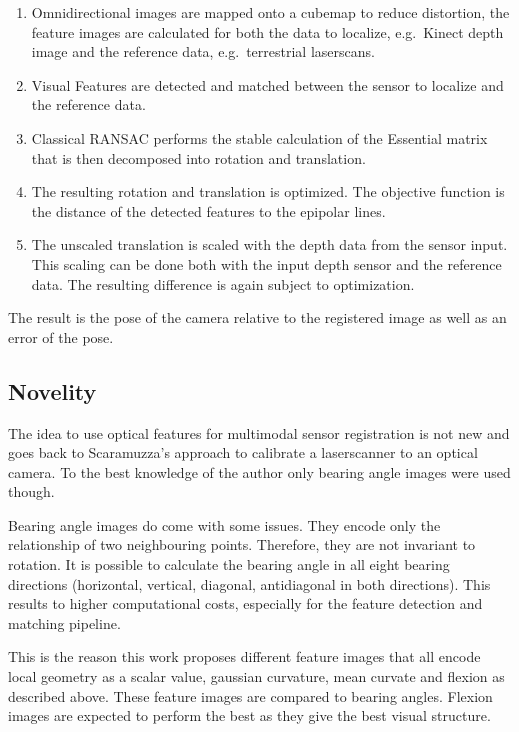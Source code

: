 \documentclass[doktyp=marbeit,fontsize=12pt,sprache=english,draft=true,hausschrift=true]{TUBAFarbeiten}
\begin{document}
\begin{enumerate}
\item Omnidirectional images are mapped onto a cubemap to reduce distortion,
  the feature images are calculated for both the data to localize,
  e.g.~Kinect depth image and the reference data, e.g.~terrestrial
  laserscans.
\item Visual Features are detected and matched between the sensor to
  localize and the reference data.
\item Classical RANSAC performs the stable calculation of the
  Essential matrix that is then decomposed into rotation and translation.
\item The resulting rotation and translation is optimized. The objective
  function is the distance of the detected features to the epipolar
  lines.
\item The unscaled translation is scaled with the depth data from the sensor
  input. This scaling can be done both with the input depth sensor and
  the reference data. The resulting difference is again subject to
  optimization.
\end{enumerate}

The result is the pose of the camera relative to the registered image as well as an error of the pose.

\subsection{Novelity}\label{novelity}

The idea to use optical features for multimodal sensor registration is
not new and goes back to Scaramuzza's approach to calibrate a
laserscanner to an optical camera. To the best knowledge of the author
only bearing angle images were used though.

Bearing angle images do come with some issues. They encode only the
relationship of two neighbouring points. Therefore, they are not
invariant to rotation. It is possible to calculate the bearing angle in
all eight bearing directions (horizontal, vertical, diagonal, antidiagonal in
both directions). This results to higher computational costs, especially
for the feature detection and matching pipeline.

This is the reason this work proposes different feature images that all
encode local geometry as a scalar value, gaussian curvature, mean
curvate and flexion as described above. These feature images are
compared to bearing angles. Flexion images are expected to perform the best
as they give the best visual structure.
\end{document}
